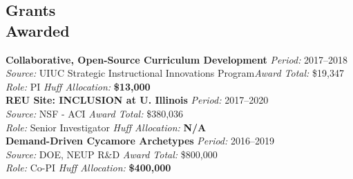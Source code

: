 \documentclass[margin,line]{resume}
\begin{document}
\begin{resume}
    \section{\mysidestyle Grants\\Awarded} 
    \textbf{Collaborative, Open-Source Curriculum Development} \hfill \textsl{Period:} 2017--2018\\
    \textsl{Source:} UIUC Strategic Instructional Innovations Program\hfill \textsl{Award Total:} \$19,347\\
    \textsl{Role:} PI \hfill \textsl{Huff Allocation:} \textbf{\$13,000}\vspace{2mm}\\%
    \textbf{REU Site: INCLUSION at U. Illinois} \hfill \textsl{Period:} 
    2017--2020\\
    \textsl{Source:} NSF - ACI \hfill \textsl{Award Total:} \$380,036\\
    \textsl{Role:} Senior Investigator \hfill \textsl{Huff Allocation:} \textbf{N/A}\vspace{2mm}\\%
    \textbf{Demand-Driven Cycamore Archetypes} \hfill \textsl{Period:} 2016--2019\\
    \textsl{Source:} DOE, NEUP R\&D \hfill \textsl{Award Total:} \$800,000\\
    \textsl{Role:} Co-PI \hfill \textsl{Huff Allocation:} \textbf{\$400,000}\vspace{2mm}\\%

\end{resume}
\end{document}
